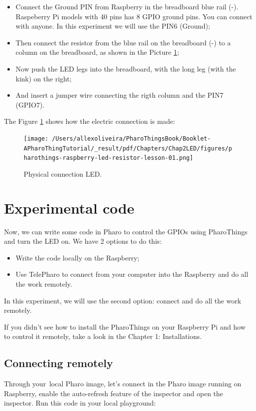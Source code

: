 \documentclass[10pt,twoside,english]{_support/latex/sbabook/sbabook}
\begin{document}
\begin{itemize}
\item Connect the Ground PIN from Raspberry in the breadboard blue rail (-). Raspeberry Pi models with 40 pins has 8 GPIO ground pins. You can connect with anyone. In this experiment we will use the PIN6 (Ground);
\item Then connect the resistor from the blue rail on the breadboard (-) to a column on the breadboard, as shown in the Picture \ref{physicalLed};
\item Now push the LED legs into the breadboard, with the long leg (with the kink) on the right;
\item And insert a jumper wire connecting the rigth column and the PIN7 (GPIO7).
\end{itemize}

The Figure \ref{physicalLed} shows how the electric connection is made:


\begin{figure}

\begin{center}
\texttt{[image: /Users/allexoliveira/PharoThingsBook/Booklet-APharoThingTutorial/\_result/pdf/Chapters/Chap2LED/figures/pharothings-raspberry-led-resistor-lesson-01.png]}\caption{Physical connection LED.\label{physicalLed}}\end{center}
\end{figure}

\section{Experimental code}


Now, we can write some code in Pharo to control the GPIOs using PharoThings and turn the LED on. We have 2 options to do this:

\begin{itemize}
\item Write the code locally on the Raspberry;
\item Use TelePharo to connect from your computer into the Raspberry and do all the work remotely.
\end{itemize}

In this experiment, we will use the second option: connect and do all the work remotely. 

If you didn’t see how to install the PharoThings on your Raspberry Pi and how to control it remotely, take a look in the Chapter 1: Installations.
\subsection{Connecting remotely}
Through your local Pharo image, let's connect in the Pharo image running on Raspberry, enable the auto-refresh feature of the inspector and open the inspector. Run this code in your local playground:
\end{document}
